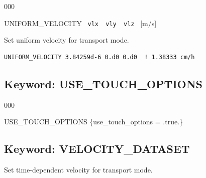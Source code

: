 \hfill\hyperlink{target_key}{\return}


\begin{deflist}{000}
\item[UNIFORM\_VELOCITY] \ {\tt vlx \ vly \ vlz} \ [m/s]
\end{deflist}

 Set uniform velocity for transport mode.

\begin{mdframed}
\footnotesize
\begin{verbatim}
UNIFORM_VELOCITY 3.84259d-6 0.d0 0.d0  ! 1.38333 cm/h
\end{verbatim}
\normalsize
\end{mdframed}

\hyperlink{target_key}{\return}


\newpage
\protect\hypertarget{target_touch}{}

\subsection{Keyword: USE\_TOUCH\_OPTIONS}

\hfill\hyperlink{target_key}{\return}


\begin{deflist}{000}
\item[USE\_TOUCH\_OPTIONS] \{use\_touch\_options = .true.\}
\end{deflist}



\hyperlink{target_key}{\return}


\newpage
\protect\hypertarget{target_veldata}{}

\subsection{Keyword: VELOCITY\_DATASET}

\hfill\hyperlink{target_key}{\return}

 Set time-dependent velocity for transport mode.

